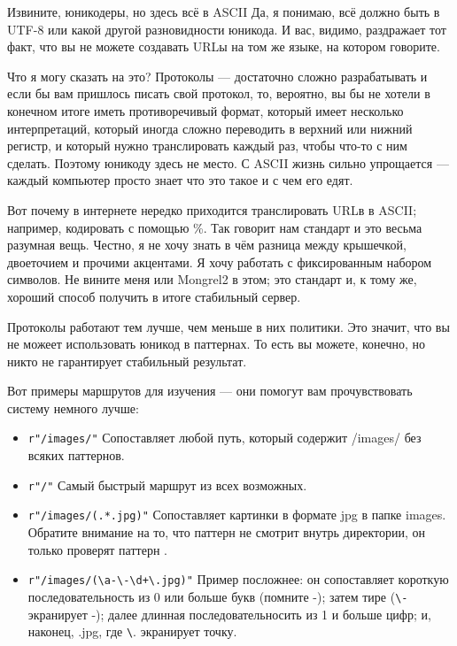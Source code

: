 \begin{aside}{Извините, юникодеры, но здесь всё в ASCII}
Да, я понимаю, всё должно быть в UTF-8 или какой другой разновидности
юникода. И вас, видимо, раздражает тот факт, что вы не можете
создавать URLы на том же языке, на котором говорите.

Что я могу сказать на это? Протоколы --- достаточно сложно
разрабатывать и если бы вам пришлось писать свой протокол, то,
вероятно, вы бы не хотели в конечном итоге иметь противоречивый
формат, который имеет несколько интерпретаций, который иногда сложно
переводить в верхний или нижний регистр, и который нужно транслировать
каждый раз, чтобы что-то с ним сделать. Поэтому юникоду здесь не
место. С ASCII жизнь сильно упрощается --- каждый компьютер просто
знает что это такое и с чем его едят.

Вот почему в интернете нередко приходится транслировать URLв в ASCII;
например, кодировать с помощью \%. Так говорит нам стандарт и это
весьма разумная вещь. Честно, я не хочу знать в чём разница между
крышечкой, двоеточием и прочими акцентами. Я хочу работать с
фиксированным набором символов. Не вините меня или Mongrel2 в этом;
это стандарт и, к тому же, хороший способ получить в итоге стабильный
сервер.

Протоколы работают тем лучше, чем меньше в них политики. Это значит,
что вы не можеет использовать юникод в паттернах. То есть вы можете,
конечно, но никто не гарантирует стабильный результат.

\end{aside}

Вот примеры маршрутов для изучения --- они помогут вам прочувствовать
систему немного лучше:

\begin{itemize}
\item \verb|r"/images/"|  Сопоставляет любой путь, который содержит
/images/ без всяких паттернов.
\item \verb|r"/"| Самый быстрый маршрут из всех возможных.
\item \verb|r"/images/(.*.jpg)"| Сопоставляет картинки в формате jpg в
папке images. Обратите внимание на то, что паттерн не смотрит внутрь
директории, он только проверят паттерн .
\item \verb|r"/images/(\a-\-\d+\.jpg)"| Пример посложнее: он
сопоставляет короткую последовательность из 0 или больше букв (помните
-); затем тире (\verb|\-| экранирует -); далее длинная
последовательносить из 1 и больше цифр; и, наконец, .jpg, где
\verb|\|. экранирует точку.
\end{itemize}

